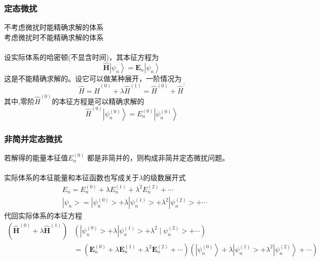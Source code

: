 \begin{frame}
  \frametitle{定态微扰}
  \emf[理想体系:] 不考虑微扰时能精确求解的体系 \\
  \emf[实际体系:] 考虑微扰时不能精确求解的体系 \\

  ~~\\ 
设实际体系的哈密顿(不显含时间)，其本征方程为
\[\hat{\boldsymbol{H}}\left|\psi_n\right\rangle =\boldsymbol{E}_n\left|\psi_n\right\rangle \]
这是不能精确求解的。设它可以做某种展开，一阶情况为
$$
\hat{H}=\hat{H}^{(0)}+\lambda\hat{H}^{(1)} =\hat{H}^{(0)}+\hat{H}^{\prime} 
$$
其中,零阶$ \hat{H}^{(0)} $的本征方程是可以精确求解的
$$
\hat{H}^{(0)}\left|\psi_n^{(0)}\right\rangle=E_n^{(0)}\left|\psi_n^{(0)}\right\rangle
$$
\end{frame} 

\begin{frame}
  \frametitle{非简并定态微扰}
若解得的能量本征值$ E_n^{(0)}$ 都是非简并的，则构成非简并定态微扰问题。\\

~~\\ 
实际体系的本征能量和本征函数也写成关于$\lambda$的级数展开式
$$
\begin{aligned}
& E_n=E_n^{(0)}+\lambda E_n^{(1)}+\lambda^2 E_n^{(2)}+\cdots \\
& \left|\psi_n>=\right| \psi_n^{(0)}>+\lambda\left|\psi_n^{(1)}>+\lambda^2\right| \psi_n^{(2)}>+\cdots
\end{aligned}
$$
代回实际体系的本征方程
\small $$ 
\begin{aligned} 
  \left(\hat{\boldsymbol{H}}^{(0)}+\lambda \hat{\boldsymbol{H}}^{(1)}\right)&\left(\left|\psi_n^{(0)}>+\lambda\right| \psi_n^{(1)}>+\lambda^2 \mid \psi_n^{(2)}>+\cdots\right) \\
  & \left.=\left(\boldsymbol{E}_n^{(0)}+\lambda \boldsymbol{E}_n^{(1)}+\lambda^2 \boldsymbol{E}_n^{(2)}+\cdots\right)\left(\left|\psi_n^{(0)}\right\rangle+\lambda\left|\psi_n^{(1)}>+\lambda^2\right| \psi_n^{(2)}\right\rangle+\cdots\right) 
\end{aligned}
$$
\end{frame} 
